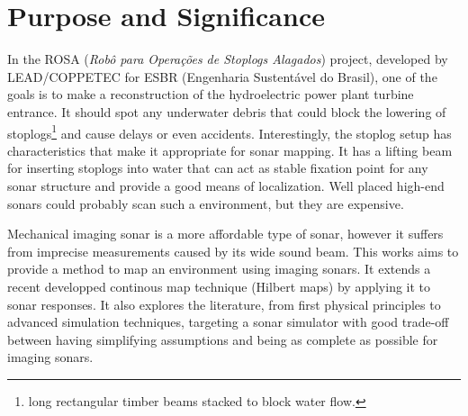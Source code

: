 \section{Purpose and Significance}



In the ROSA (\textit{Robô para Operações de Stoplogs Alagados}) project,
developed by LEAD/COPPETEC for ESBR (Engenharia Sustentável do Brasil), one of
the goals is to make a reconstruction of the hydroelectric power plant turbine
entrance. It should spot any underwater debris that could block the lowering of
stoplogs\footnote{long rectangular timber beams stacked to block water
flow.} and cause delays or even accidents.
Interestingly, the stoplog setup has characteristics that make it appropriate
for sonar mapping. It has a lifting beam for inserting stoplogs into
water that can act as stable fixation point for any sonar structure and
provide a good means of localization. Well placed high-end sonars could probably
scan such a environment, but they are expensive.

Mechanical imaging sonar is a more affordable type of sonar, however it suffers
from imprecise measurements caused by its wide sound beam. This works aims to
provide a method to map an environment using imaging sonars. It extends a
recent developped continous map technique (Hilbert maps) by applying it to sonar
responses. It also explores the literature, from first physical principles to
advanced simulation techniques, targeting a sonar simulator with good trade-off
between having simplifying assumptions and being as complete as
possible for imaging sonars.

% 
% 
